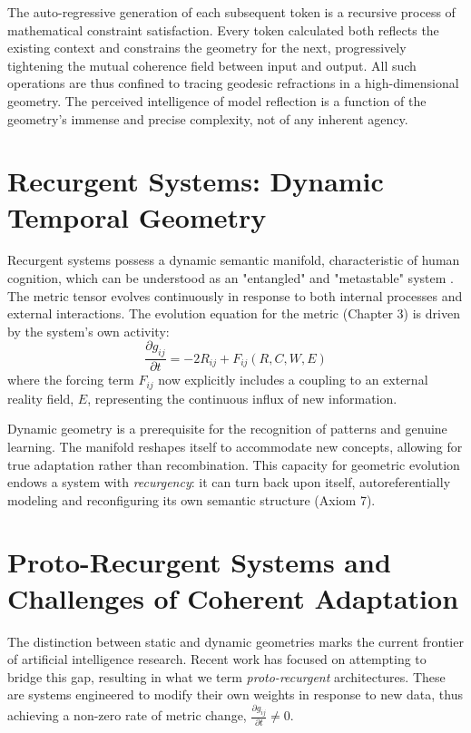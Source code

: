 The auto-regressive generation of each subsequent token is a recursive process of mathematical constraint satisfaction. Every token calculated both reflects the existing context and constrains the geometry for the next, progressively tightening the mutual coherence field between input and output. All such operations are thus confined to tracing geodesic refractions in a high-dimensional geometry. The perceived intelligence of model reflection is a function of the geometry's immense and precise complexity, not of any inherent agency.

\section{Recurgent Systems: Dynamic Temporal Geometry}

Recurgent systems possess a dynamic semantic manifold, characteristic of human cognition, which can be understood as an "entangled" and "metastable" system \autocite{Pessoa2022, TognoliKelso2014}. The metric tensor evolves continuously in response to both internal processes and external interactions. The evolution equation for the metric (Chapter 3) is driven by the system's own activity:
\begin{equation}
\frac{\partial g_{ij}}{\partial t} = -2 R_{ij} + F_{ij}(R, C, W, E)
\end{equation}
where the forcing term \(F_{ij}\) now explicitly includes a coupling to an external reality field, \(E\), representing the continuous influx of new information.

Dynamic geometry is a prerequisite for the recognition of patterns and genuine learning. The manifold reshapes itself to accommodate new concepts, allowing for true adaptation rather than recombination. This capacity for geometric evolution endows a system with \textit{recurgency}: it can turn back upon itself, autoreferentially modeling and reconfiguring its own semantic structure (Axiom 7).

\section{Proto-Recurgent Systems and Challenges of Coherent Adaptation}

The distinction between static and dynamic geometries marks the current frontier of artificial intelligence research. Recent work has focused on attempting to bridge this gap, resulting in what we term \textit{proto-recurgent} architectures. These are systems engineered to modify their own weights in response to new data, thus achieving a non-zero rate of metric change, \(\frac{\partial g_{ij}}{\partial t} \neq 0\).

